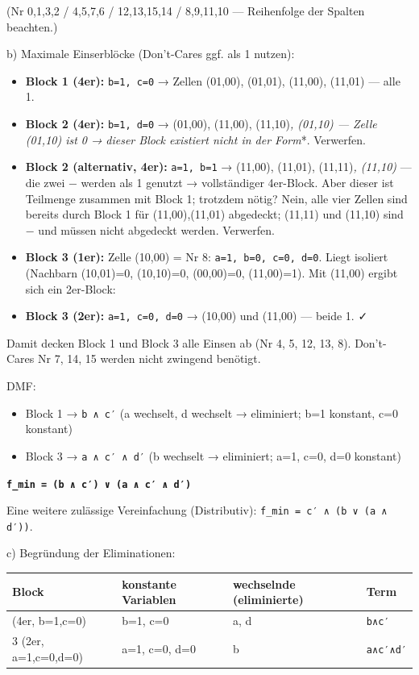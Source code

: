 \documentclass[11pt, a4paper]{article}
\begin{document}
(Nr 0,1,3,2 / 4,5,7,6 / 12,13,15,14 / 8,9,11,10 — Reihenfolge der Spalten beachten.)


b) Maximale Einserblöcke (Don't-Cares ggf. als 1 nutzen):


\begin{itemize}
  \item \textbf{Block 1 (4er):} \texttt{b=1, c=0} → Zellen (01,00), (01,01), (11,00), (11,01) — alle 1.
  \item \textbf{Block 2 (4er):} \texttt{b=1, d=0} → (01,00), (11,00), (11,10)\textit{, (01,10) — Zelle (01,10) ist 0 → }\textit{dieser Block existiert nicht in der Form}*. Verwerfen.
  \item \textbf{Block 2 (alternativ, 4er):} \texttt{a=1, b=1} → (11,00), (11,01), (11,11)\textit{, (11,10)} — die zwei − werden als 1 genutzt → vollständiger 4er-Block. Aber dieser ist Teilmenge zusammen mit Block 1; trotzdem nötig? Nein, alle vier Zellen sind bereits durch Block 1 für (11,00),(11,01) abgedeckt; (11,11) und (11,10) sind − und müssen nicht abgedeckt werden. Verwerfen.
  \item \textbf{Block 3 (1er):} Zelle (10,00) = Nr 8: \texttt{a=1, b=0, c=0, d=0}. Liegt isoliert (Nachbarn (10,01)=0, (10,10)=0, (00,00)=0, (11,00)=1). Mit (11,00) ergibt sich ein 2er-Block:
  \item \textbf{Block 3 (2er):} \texttt{a=1, c=0, d=0} → (10,00) und (11,00) — beide 1. ✓
\end{itemize}

Damit decken Block 1 und Block 3 alle Einsen ab (Nr 4, 5, 12, 13, 8). Don't-Cares Nr 7, 14, 15 werden nicht zwingend benötigt.


DMF:

\begin{itemize}
  \item Block 1 → \texttt{b ∧ c′} (a wechselt, d wechselt → eliminiert; b=1 konstant, c=0 konstant)
  \item Block 3 → \texttt{a ∧ c′ ∧ d′} (b wechselt → eliminiert; a=1, c=0, d=0 konstant)
\end{itemize}

\textbf{\texttt{f\_min = (b ∧ c′) ∨ (a ∧ c′ ∧ d′)}}


Eine weitere zulässige Vereinfachung (Distributiv): \texttt{f\_min = c′ ∧ (b ∨ (a ∧ d′))}.


c) Begründung der Eliminationen:



{\small
\begin{tabularx}{\linewidth}{XXXX}
\hline
\rowcolor{tableheadbg}
{\color{white}\textbf{Block}} & {\color{white}\textbf{konstante Variablen}} & {\color{white}\textbf{wechselnde (eliminierte)}} & {\color{white}\textbf{Term}} \\[2pt]
\hline
\endhead
\hline
\endfoot
1 (4er, b=1,c=0) & b=1, c=0 & a, d & \texttt{b∧c′} \\
3 (2er, a=1,c=0,d=0) & a=1, c=0, d=0 & b & \texttt{a∧c′∧d′} \\
\end{tabularx}
}
\end{document}
